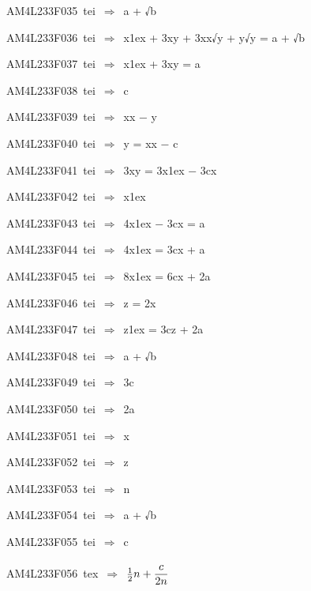 {\sixrm AM4L233F035\ {\sixit tei}\ }$\Rightarrow$\ {\tenit a} + √{\tenit b}\par\smallskip
{\sixrm AM4L233F036\ {\sixit tei}\ }$\Rightarrow$\ {\tenit x}\raise1ex\hbox{} + 3{\tenit xy} + 3{\tenit xx}√{\tenit y} + {\tenit y}√{\tenit y} = {\tenit a} + √{\tenit b}\par\smallskip
{\sixrm AM4L233F037\ {\sixit tei}\ }$\Rightarrow$\ {\tenit x}\raise1ex\hbox{} + 3{\tenit xy} = {\tenit a}\par\smallskip
{\sixrm AM4L233F038\ {\sixit tei}\ }$\Rightarrow$\ {\tenit c}\par\smallskip
{\sixrm AM4L233F039\ {\sixit tei}\ }$\Rightarrow$\ {\tenit xx} − {\tenit y}\par\smallskip
{\sixrm AM4L233F040\ {\sixit tei}\ }$\Rightarrow$\ {\tenit y} = {\tenit xx} − {\tenit c}\par\smallskip
{\sixrm AM4L233F041\ {\sixit tei}\ }$\Rightarrow$\ 3{\tenit xy} = 3{\tenit x}\raise1ex\hbox{} − 3{\tenit cx}\par\smallskip
{\sixrm AM4L233F042\ {\sixit tei}\ }$\Rightarrow$\ {\tenit x}\raise1ex\hbox{}\par\smallskip
{\sixrm AM4L233F043\ {\sixit tei}\ }$\Rightarrow$\ 4{\tenit x}\raise1ex\hbox{} − 3{\tenit cx} = {\tenit a}\par\smallskip
{\sixrm AM4L233F044\ {\sixit tei}\ }$\Rightarrow$\ 4{\tenit x}\raise1ex\hbox{} = 3{\tenit cx} + {\tenit a}\par\smallskip
{\sixrm AM4L233F045\ {\sixit tei}\ }$\Rightarrow$\ 8{\tenit x}\raise1ex\hbox{} = 6{\tenit cx} + 2{\tenit a}\par\smallskip
{\sixrm AM4L233F046\ {\sixit tei}\ }$\Rightarrow$\ {\tenit z} = 2{\tenit x}\par\smallskip
{\sixrm AM4L233F047\ {\sixit tei}\ }$\Rightarrow$\ {\tenit z}\raise1ex\hbox{} = 3{\tenit cz} + 2{\tenit a}\par\smallskip
{\sixrm AM4L233F048\ {\sixit tei}\ }$\Rightarrow$\ {\tenit a} + √{\tenit b}\par\smallskip
{\sixrm AM4L233F049\ {\sixit tei}\ }$\Rightarrow$\ 3{\tenit c}\par\smallskip
{\sixrm AM4L233F050\ {\sixit tei}\ }$\Rightarrow$\ 2{\tenit a}\par\smallskip
{\sixrm AM4L233F051\ {\sixit tei}\ }$\Rightarrow$\ {\tenit x}\par\smallskip
{\sixrm AM4L233F052\ {\sixit tei}\ }$\Rightarrow$\ {\tenit z}\par\smallskip
{\sixrm AM4L233F053\ {\sixit tei}\ }$\Rightarrow$\ {\tenit n}\par\smallskip
{\sixrm AM4L233F054\ {\sixit tei}\ }$\Rightarrow$\ {\tenit a} + √{\tenit b}\par\smallskip
{\sixrm AM4L233F055\ {\sixit tei}\ }$\Rightarrow$\ {\tenit c}\par\smallskip
{\sixrm AM4L233F056\ {\sixit tex}\ }$\Rightarrow$\ ${{1\over 2}}n + {{\displaystyle\strut c\over \displaystyle\strut 2n}}$\par\smallskip

